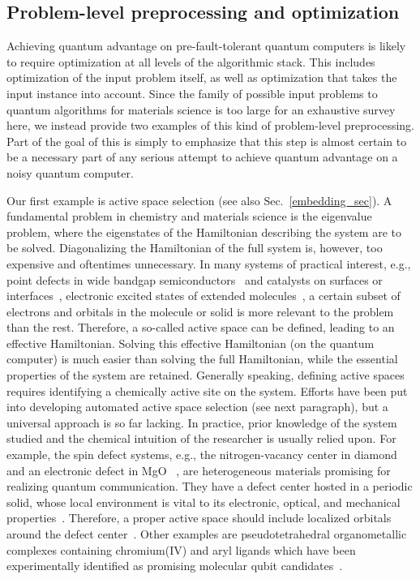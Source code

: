 \subsection{Problem-level preprocessing and optimization}

Achieving quantum advantage on pre-fault-tolerant quantum computers is likely to require optimization at all levels of the algorithmic stack.
This includes optimization of the input problem itself, as well as optimization that takes the input instance into account.
Since the family of possible input problems to quantum algorithms for materials science is too large for an exhaustive survey here, we instead provide two examples of this kind of problem-level preprocessing.
Part of the goal of this is simply to emphasize that this step is almost certain to be a necessary part of any serious attempt to achieve quantum advantage on a noisy quantum computer.

Our first example is active space selection (see also Sec.~\ref{embedding_sec}).
A fundamental problem in chemistry and materials science is the eigenvalue problem, where the eigenstates of the Hamiltonian describing the system are to be solved.
Diagonalizing the Hamiltonian of the full system is, however, too expensive and oftentimes unnecessary.
In many systems of practical interest, e.g., point defects in wide bandgap semiconductors~\cite{wolfowicz2021quantum} and catalysts on surfaces or interfaces~\cite{gujarati2023quantum}, electronic excited states of extended molecules~\cite{Sarkar2023}, a certain subset of electrons and orbitals in the molecule or solid is more relevant to the problem than the rest.
Therefore, a so-called active space can be defined, leading to an effective Hamiltonian. Solving this effective Hamiltonian (on the quantum computer) is much easier than solving the full Hamiltonian, while the essential properties of the system are retained. Generally speaking, defining active spaces requires identifying a chemically active site on the system. Efforts have been put into developing automated active space selection (see next paragraph), but a universal approach is so far lacking. In practice, prior knowledge of the system studied and the chemical intuition of the researcher is usually relied upon. For example, the spin defect systems, e.g., the nitrogen-vacancy center in diamond and an electronic defect in MgO~\cite{maze2011properties}\cite{mitra2021excited, haldar2023local, Verma2023} , are heterogeneous materials promising for realizing quantum communication. They have a defect center hosted in a periodic solid, whose local environment is vital to its electronic, optical, and mechanical properties~\cite{doherty2013nitrogen}. Therefore, a proper active space should include localized orbitals around the defect center~\cite{ma2020quantum, sheng2022green}. Other examples are pseudotetrahedral organometallic complexes containing chromium(IV) and aryl ligands which have been experimentally identified as promising molecular qubit candidates~\cite{Sauza-delaVega2022, Bayliss2020}.


